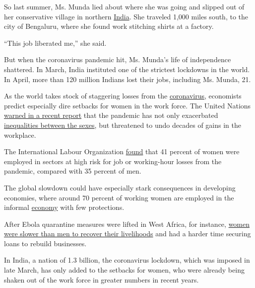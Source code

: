 So last summer, Ms. Munda lied about where she was going and slipped out
of her conservative village in northern
\href{https://www.nytimes.com/2020/07/02/world/asia/india-coronavirus-wedding-groom.html}{India}.
She traveled 1,000 miles south, to the city of Bengaluru, where she
found work stitching shirts at a factory.

``This job liberated me,'' she said.

But when the coronavirus pandemic hit, Ms. Munda's life of independence
shattered. In March, India instituted one of the strictest lockdowns in
the world. In April, more than 120 million Indians lost their jobs,
including Ms. Munda, 21.

As the world takes stock of staggering losses from the
\href{https://www.nytimes.com/2020/07/15/business/economy/economic-recovery-coronavirus-resurgence.html}{coronavirus},
economists predict especially dire setbacks for women in the work force.
The United Nations
\href{https://www.unwomen.org/-/media/headquarters/attachments/sections/library/publications/2020/policy-brief-the-impact-of-covid-19-on-women-en.pdf?la=en\&vs=1406}{warned
in a recent report} that the pandemic has not only exacerbated
\href{https://www.nytimes.com/2020/05/09/us/unemployment-coronavirus-women.html}{inequalities
between the sexes}, but threatened to undo decades of gains in the
workplace.

The International Labour Organization
\href{https://www.ilo.org/wcmsp5/groups/public/---dgreports/---gender/documents/publication/wcms_744685.pdf}{found}
that 41 percent of women were employed in sectors at high risk for job
or working-hour losses from the pandemic, compared with 35 percent of
men.

The global slowdown could have especially stark consequences in
developing economies, where around 70 percent of working women are
employed in the informal
\href{https://www.nytimes.com/2020/07/15/business/economy/economic-recovery-coronavirus-resurgence.html}{economy}
with few protections.

After Ebola quarantine measures were lifted in West Africa, for
instance,
\href{https://www.un.org/sites/un2.un.org/files/policy_brief_on_covid_impact_on_women_9_apr_2020_updated.pdf}{women
were slower than men to recover their livelihoods} and had a harder time
securing loans to rebuild businesses.

In India, a nation of 1.3 billion, the coronavirus lockdown, which was
imposed in late March, has only added to the setbacks for women, who
were already being shaken out of the work force in greater numbers in
recent years.

